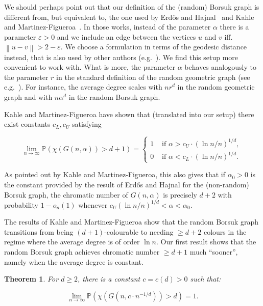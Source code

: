 \documentclass[11pt]{article}%
\newtheorem{theorem}{Theorem} %
\newcommand{\norm}[1]{\ensuremath{\left\|#1\right\|}}
\newcommand{\Pee}[0]{\ensuremath{{\mathbb P}}}
\newcommand{\eps}{\varepsilon}
\begin{document}
We should perhaps point out that our definition of the (random) Borsuk graph is different from, but equivalent to, the one 
used by Erd\H{o}s and Hajnal~\cite{ErdosHajnal67} and Kahle and Martinez-Figueroa~\cite{KahleFig}.
In those works, instead of the parameter $\alpha$ there is a 
parameter $\eps>0$ and we include an edge between the vertices $u$ and $v$ iff.~$\norm{u-v} > 2-\eps$.
We choose a formulation in terms of the geodesic distance instead, that is also used by other 
authors (e.g.~\cite{AdamsEtal}).
We find this setup more convenient to work with. What is more, the parameter $\alpha$ behaves analogously to the parameter $r$ in the 
standard definition of the random geometric graph (see e.g.~\cite{penroseboek}).
For instance, the average degree scales with $n r^d$ in the random geometric graph and with $n \alpha^d$ in the random Borsuk 
graph.

Kahle and Martinez-Figueroa have shown that (translated into our setup) 
there exist constants $c_L,c_U$ satisfying

\begin{equation}\label{eq:KF} 
\lim_{n\to\infty} \Pee\left( \chi\left( G(n,\alpha) \right) > d+1 \right) =
 \begin{cases}
 1 & \text{ if $\alpha > c_U\cdot(\ln n/n)^{1/d}$, } \\
 0 & \text{ if $\alpha < c_L\cdot(\ln n/n)^{1/d}$. }
 \end{cases}
\end{equation}

\noindent
As pointed out by Kahle and Martinez-Figueroa, this also gives that if $\alpha_0 > 0$ is the constant 
provided by the result of Erd\H{o}s and Hajnal for the (non-random) Borsuk graph, the chromatic number 
of $G(n,\alpha)$ is precisely $d+2$ with probability $1-o_n(1)$ whenever
$c_U (\ln n/n)^{1/d} < \alpha < \alpha_0$.

The results of Kahle and Martinez-Figueroa show that the random Borsuk graph transitions from 
being $(d+1)$-colourable to needing $\geq d+2$ colours in the regime where the average degree is of order $\ln n$.
Our first result shows that the random Borsuk graph achieves chromatic number $\geq d+1$ much ``sooner'', namely when the
average degree is constant. 


\begin{theorem}\label{thm:maind+1}
For $d\geq 2$, there is a constant $c=c(d)>0$ such that:
 
 $$ \lim_{n\to\infty} \Pee\left( \chi\left( G(n, c \cdot n^{-1/d}) \right) > d \right) = 1.$$
 
\end{theorem}
\end{document}
